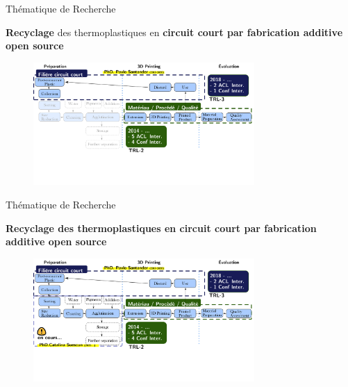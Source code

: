 \documentclass[
  11pt,
  ignorenonframetext,
  aspectratio=169,
  c]{beamer}
\begin{document}
\begin{frame}[t]{Thématique de Recherche}
\protect\hypertarget{thuxe9matique-de-recherche-2}{}
\small

\textbf{Recyclage} des thermoplastiques en \textbf{circuit court par
fabrication additive open source}

\begin{figure}

{\centering \includegraphics[width=0.75\textwidth,height=\textheight]{Figures/slides/DRAM-03.png}

}

\end{figure}
\end{frame}

\begin{frame}[t]{Thématique de Recherche}
\protect\hypertarget{thuxe9matique-de-recherche-3}{}
\small

\textbf{Recyclage des thermoplastiques en circuit court par fabrication
additive open source}

\begin{figure}

{\centering \includegraphics[width=0.75\textwidth,height=\textheight]{Figures/slides/DRAM-04.png}

}

\end{figure}
\end{frame}
\end{document}

